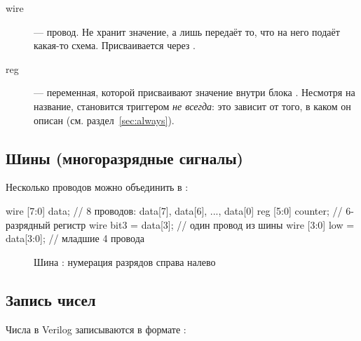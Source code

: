\begin{description}
  \item[wire] --- провод. Не хранит значение, а лишь передаёт то, что на него
    подаёт какая-то схема. Присваивается через .
  \item[reg] --- переменная, которой присваивают значение внутри блока
    . Несмотря на название,  становится триггером
    \emph{не всегда}: это зависит от того, в каком  он описан (см.
    раздел~\ref{sec:always}).
\end{description}

\subsection{Шины (многоразрядные сигналы)}

Несколько проводов можно объединить в :
\begin{vcode}
wire [7:0] data;      // 8 проводов: data[7], data[6], ..., data[0]
reg  [5:0] counter;   // 6-разрядный регистр
wire       bit3 = data[3];      // один провод из шины
wire [3:0] low  = data[3:0];    // младшие 4 провода
\end{vcode}

\begin{figure}[H]
\centering
{}
\caption{Шина \code{[7:0]}: нумерация разрядов справа налево}
\end{figure}

\subsection{Запись чисел}

Числа в Verilog записываются в формате :

